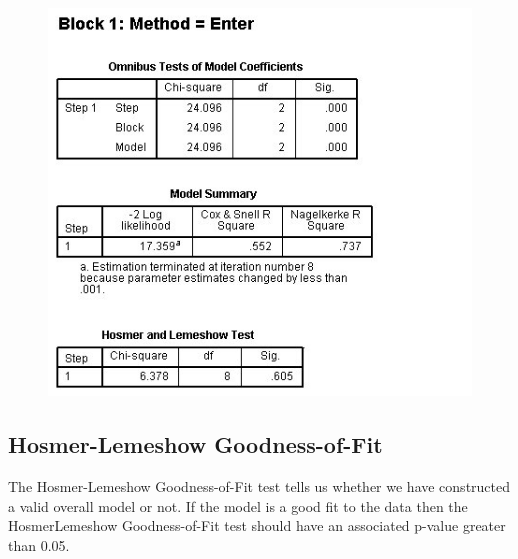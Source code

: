 \documentclass[a4paper,12pt]{article}
\begin{document}
\begin{figure}[h!]
	\centering
	\includegraphics[width=0.9\linewidth]{images/Logistic5}
\end{figure}





\newpage





\newpage
\subsection{Hosmer-Lemeshow Goodness-of-Fit}
The Hosmer-Lemeshow Goodness-of-Fit
test tells us whether we have constructed a valid overall model or not.
If the model is a good fit to the data then the HosmerLemeshow Goodness-of-Fit test should have an associated p-value greater than 0.05.


\end{document}
